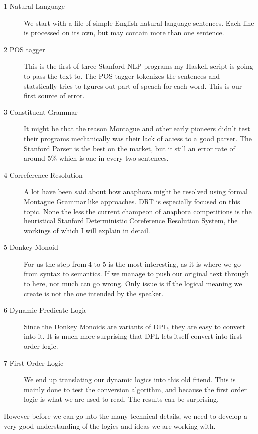 \documentclass[12pt]{article}
\begin{document}
\begin{description}
\item[1 Natural Language] We start with a file of simple English natural language sentences. Each line is processed on its own, but may contain more than one sentence.

\item[2 POS tagger] This is the first of three Stanford NLP programs my Haskell script is going to pass the text to. The POS tagger tokenizes the sentences and statstically tries to figures out part of speach for each word. This is our first source of error.

\item[3 Constituent Grammar] It might be that the reason Montague and other early pioneers didn't test their programs mechanically was their lack of access to a good parser. The Stanford Parser is the best on the market, but it still an error rate of around 5\% which is one in every two sentences.

\item[4 Correference Resolution] A lot have been said about how anaphora might be resolved using formal Montague Grammar like approaches. DRT is especially focused on this topic. None the less the current champeon of anaphora competitions\cite{lee2011stanford}\cite{raghunathan2010multi} is the heuristical Stanford Deterministic Coreference Resolution System, the workings of which I will explain in detail.

\item[5 Donkey Monoid] For us the step from 4 to 5 is the most interesting, as it is where we go from syntax to semantics. If we manage to push our original text through to here, not much can go wrong. Only issue is if the logical meaning we create is not the one intended by the speaker.

\item[6 Dynamic Predicate Logic] Since the Donkey Monoids are variants of DPL, they are easy to convert into it. It is much more surprising that DPL lets itself convert into first order logic.

\item[7 First Order Logic] We end up translating our dynamic logics into this old friend. This is mainly done to test the conversion algorithm, and because the first order logic is what we are used to read. The results can be surprising.
\end{description}

However before we can go into the many technical details, we need to develop a very good understanding of the logics and ideas we are working with.
\end{document}
